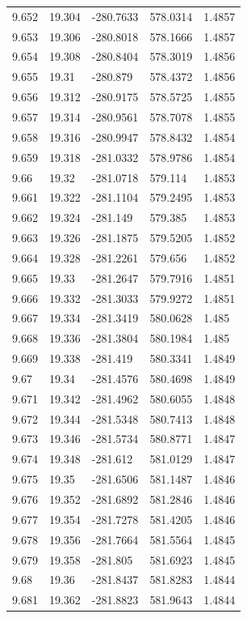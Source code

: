 \begin{tabular}{lllll}
9.652 & 19.304 & -280.7633 & 578.0314 & 1.4857 \\
9.653 & 19.306 & -280.8018 & 578.1666 & 1.4857 \\
9.654 & 19.308 & -280.8404 & 578.3019 & 1.4856 \\
9.655 & 19.31 & -280.879 & 578.4372 & 1.4856 \\
9.656 & 19.312 & -280.9175 & 578.5725 & 1.4855 \\
9.657 & 19.314 & -280.9561 & 578.7078 & 1.4855 \\
9.658 & 19.316 & -280.9947 & 578.8432 & 1.4854 \\
9.659 & 19.318 & -281.0332 & 578.9786 & 1.4854 \\
9.66 & 19.32 & -281.0718 & 579.114 & 1.4853 \\
9.661 & 19.322 & -281.1104 & 579.2495 & 1.4853 \\
9.662 & 19.324 & -281.149 & 579.385 & 1.4853 \\
9.663 & 19.326 & -281.1875 & 579.5205 & 1.4852 \\
9.664 & 19.328 & -281.2261 & 579.656 & 1.4852 \\
9.665 & 19.33 & -281.2647 & 579.7916 & 1.4851 \\
9.666 & 19.332 & -281.3033 & 579.9272 & 1.4851 \\
9.667 & 19.334 & -281.3419 & 580.0628 & 1.485 \\
9.668 & 19.336 & -281.3804 & 580.1984 & 1.485 \\
9.669 & 19.338 & -281.419 & 580.3341 & 1.4849 \\
9.67 & 19.34 & -281.4576 & 580.4698 & 1.4849 \\
9.671 & 19.342 & -281.4962 & 580.6055 & 1.4848 \\
9.672 & 19.344 & -281.5348 & 580.7413 & 1.4848 \\
9.673 & 19.346 & -281.5734 & 580.8771 & 1.4847 \\
9.674 & 19.348 & -281.612 & 581.0129 & 1.4847 \\
9.675 & 19.35 & -281.6506 & 581.1487 & 1.4846 \\
9.676 & 19.352 & -281.6892 & 581.2846 & 1.4846 \\
9.677 & 19.354 & -281.7278 & 581.4205 & 1.4846 \\
9.678 & 19.356 & -281.7664 & 581.5564 & 1.4845 \\
9.679 & 19.358 & -281.805 & 581.6923 & 1.4845 \\
9.68 & 19.36 & -281.8437 & 581.8283 & 1.4844 \\
9.681 & 19.362 & -281.8823 & 581.9643 & 1.4844 \\

\end{tabular}
